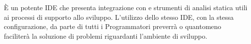 			È un potente IDE che presenta integrazione con  e strumenti di analisi statica utili
			ai processi di supporto allo sviluppo. L'utilizzo dello stesso IDE, con la stessa configurazione, da parte di
			tutti i Programmatori preverrà o quantomeno faciliterà la soluzione di problemi riguardanti l'ambiente di sviluppo.
